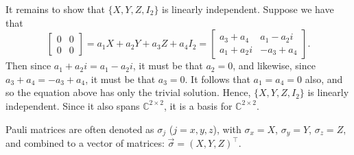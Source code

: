 \documentclass{../../../kin_math}
\begin{document}
\begin{questions}
\begin{solution}
    It remains to show that $\{X, Y, Z, I_2\}$ is linearly independent. Suppose we have that
    \begin{equation*}
      \begin{bmatrix} 0 & 0 \\ 0 & 0 \end{bmatrix} = a_1 X + a_2 Y + a_3 Z + a_4 I_2 = \begin{bmatrix} a_3 + a_4 & a_1 - a_2i \\ a_1 + a_2i & -a_3 + a_4 \end{bmatrix}.
    \end{equation*}
    Then since $a_1 + a_2i = a_1 - a_2i$, it must be that $a_2 = 0$, and likewise, since $a_3 + a_4 = -a_3 + a_4$, it must be that $a_3 = 0$. It follows that $a_1 = a_4 = 0$ also, and so the equation above has only the trivial solution. Hence, $\{X, Y, Z, I_2\}$ is linearly independent. Since it also spans $\mathbb{C}^{2 \times 2}$, it is a basis for $\mathbb{C}^{2 \times 2}$.
  \end{solution}

  \question Pauli matrices are often denoted as $\sigma_j$ ($j = x, y, z$), with $\sigma_x = X$, $\sigma_y = Y$, $\sigma_z = Z$, and combined to a vector of matrices: $\vec{\sigma} = (X, Y, Z)^\top$.


\end{questions}
\end{document}
